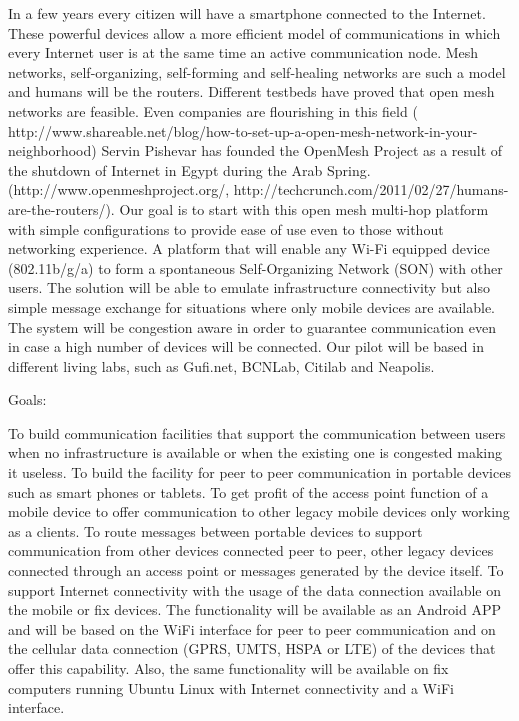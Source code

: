 \documentclass[draftclsnofoot,12pt,journal,onecolumn]{IEEEtran}
\begin{document}
In a few years every citizen will have a smartphone connected to the
Internet. These powerful devices allow a more efficient model of
communications in which every Internet user is at the same time an active
communication node. Mesh networks, self-organizing, self-forming and
self-healing networks are such a model and humans will be the routers.
Different testbeds have proved that open mesh networks are feasible. Even
companies are flourishing in this field (
http://www.shareable.net/blog/how-to-set-up-a-open-mesh-network-in-your-neighborhood)
Servin Pishevar has founded the OpenMesh Project as a result of the shutdown
of Internet in Egypt during the Arab Spring.(http://www.openmeshproject.org/,
http://techcrunch.com/2011/02/27/humans-are-the-routers/).
Our goal is to start with this open mesh multi-hop platform with simple
configurations to provide ease of use even to those without networking
experience. A platform that will enable any Wi-Fi equipped device
(802.11b/g/a) to form a spontaneous Self-Organizing Network (SON) with other
users.
The solution will be able to emulate infrastructure connectivity but also
simple message exchange for situations where only mobile devices are
available. The system will be congestion aware in order to guarantee
communication even in case a high number of devices will be connected.
Our pilot will be based in different living labs, such as  Gufi.net, BCNLab,
Citilab and Neapolis.

Goals:

To build communication facilities that support the communication between
users when no infrastructure is available or when the existing one is
congested making it useless.
To build the facility for peer to peer communication in portable devices such
as smart phones or tablets.
To get profit of the access point function of a mobile device to offer
communication to other legacy mobile devices only working as a clients.
To route messages between portable devices to support communication from
other devices connected peer to peer, other legacy devices connected through
an access point or messages generated by the device itself.
To support Internet connectivity with the usage of the data connection
available on the mobile or fix devices.
The functionality will be available as an Android APP and will be based on
the WiFi interface for peer to peer communication and on the cellular data
connection (GPRS, UMTS, HSPA or LTE) of the devices that offer this
capability. Also, the same functionality will be available on fix computers
running Ubuntu Linux with Internet connectivity and a WiFi interface.
\end{document}
